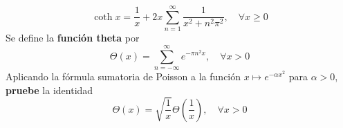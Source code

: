 \documentclass[12pt]{report}
\theoremstyle{largebreak}
\renewcommand{\geq}{\ensuremath{\geqslant}}
\begin{document}
\begin{excer}
\begin{enumerate}
            \begin{equation*}
                \coth x = \frac{1}{x}+2x\sum_{ n=1}^{\infty}\frac{1}{x^2+n^2\pi^2},\quad\forall x\geq0
            \end{equation*}
            Se define la \textbf{función theta} por
            \begin{equation*}
                \Theta(x)=\sum_{ n=-\infty}^{\infty}e^{ -\pi n^2x},\quad\forall x>0
            \end{equation*}
            Aplicando la fórmula sumatoria de Poisson a la función $x\mapsto e^{-\alpha x^2}$ para $\alpha>0$, \textbf{pruebe} la identidad
            \begin{equation*}
                \Theta(x)=\sqrt{\frac{1}{x}}\Theta\left(\frac{1}{x}\right),\quad\forall x>0
            \end{equation*}
        \end{enumerate}
    \end{excer}
\end{document}
